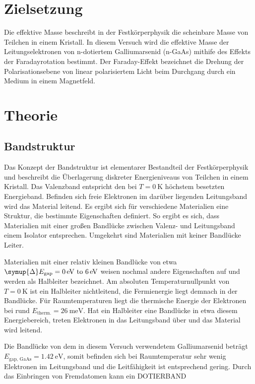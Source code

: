 \section{Zielsetzung}
\label{sec:Zielsetzung}
Die effektive Masse beschreibt in der Festkörperphysik die scheinbare Masse von Teilchen in einem Kristall. In diesem Versuch wird die effektive Masse der Leitungselektronen von
n-dotiertem Galliumarsenid (n-GaAs) mithife des Effekts der Faradayrotation bestimmt. Der Faraday-Effekt bezeichnet die Drehung der Polarisationsebene von linear polarisiertem Licht
beim Durchgang durch ein Medium in einem Magnetfeld.

\section{Theorie}
\label{sec:Theorie}
\subsection{Bandstruktur}
\label{subsec:Bandstruktur}
Das Konzept der Bandstruktur ist elementarer Bestandteil der Festkörperphysik und beschreibt die Überlagerung diskreter Energieniveaus von Teilchen in einem Kristall. Das Valenzband
entspricht den bei $T=\qty{0}{\kelvin}$ höchstem besetzten Energieband. Befinden sich freie Elektronen im darüber liegenden Leitungsband wird das Material leitend.
Es ergibt sich für verschiedene Materialien eine Struktur, die bestimmte Eigenschaften definiert. So ergibt es sich, dass Materialien mit einer großen Bandlücke zwischen 
Valenz- und Leitungsband einem Isolator entsprechen. Umgekehrt sind Materialien mit keiner Bandlücke Leiter.

Materialien mit einer relativ kleinen Bandlücke von etwa $\symup{\Delta}E_{\text{gap}}=\qtyrange{0}{6}{\electronvolt}$ weisen nochmal andere Eigenschaften auf und werden als Halbleiter
bezeichnet. Am absoluten Temperaturnullpunkt von $T=\qty{0}{\kelvin}$ ist ein Halbleiter nichtleitend, die Fermienergie liegt demnach in der Bandlücke. Für Raumtemperaturen liegt die
thermische Energie der Elektronen bei rund $E_{\text{therm.}}=\qty{26}{\milli\electronvolt}$. Hat ein Halbleiter eine Bandlücke in etwa diesem Energiebereich, treten Elektronen in das 
Leitungsband über und das Material wird leitend.

Die Bandlücke von dem in diesem Versuch verwendetem Galliumarsenid beträgt $E_{\text{gap, GaAs}} = \qty{1,42}{\electronvolt}$, somit befinden sich bei Raumtemperatur sehr wenig 
Elektronen im Leitungsband und die Leitfähigkeit ist entsprechend gering. Durch das Einbringen von Fremdatomen kann ein DOTIERBAND 

